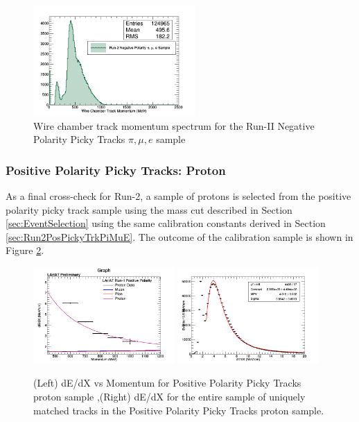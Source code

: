 \begin{figure}[htb]
\centering
\includegraphics[width=0.55\textwidth]{images/WCTrkMomentumRun2NegPiMuE.png}
\caption{Wire chamber track momentum spectrum for the Run-II Negative Polarity Picky Tracks $\pi, \mu, e$ sample  }
\label{fig:Run2NegPickyTrkPiMuEMomentumSpec}
\end{figure}


\subsubsection{Positive Polarity Picky Tracks: Proton}\label{sec:Run2PosPickyTrkProton}

As a final cross-check for Run-2, a sample of protons is selected from the positive polarity picky track sample using the mass cut described in Section \ref{sec:EventSelection} using the same calibration constants derived in Section \ref{sec:Run2PosPickyTrkPiMuE}. The outcome of the calibration sample is shown in Figure \ref{fig:Run2PosPickyTrkProtonResults}.

\begin{figure}[htb]
\centering
\includegraphics[width=0.48\textwidth]{images/dEdXvsMomentumPosPolRun2ProtonFineBin.png}
\includegraphics[width=0.48\textwidth]{images/dEdXPosPolRun2Proton.png}
\caption{(Left) dE/dX vs Momentum for Positive Polarity Picky Tracks proton sample ,(Right) dE/dX for the entire sample of uniquely matched tracks in the Positive Polarity Picky Tracks proton sample.}
\label{fig:Run2PosPickyTrkProtonResults}
\end{figure}

